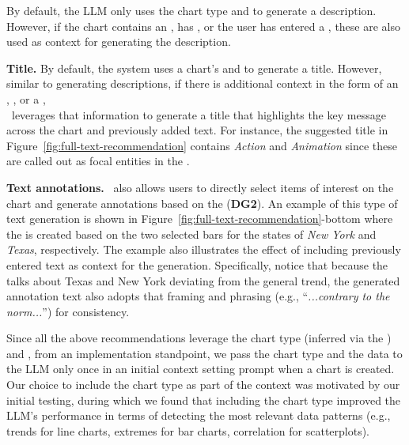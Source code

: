 {By default, the LLM only uses the chart type and  to generate a description.
However, if the chart contains an , has , or the user has entered a , these are also used as context for generating the description.

\textbf{Title.}
By default, the system uses a chart's  and  to generate a title.
However, similar to generating descriptions, if there is additional context in the form of an , , or a ,\\ \pluto~leverages that information to generate a title that highlights the key message across the chart and previously added text.
For instance, the suggested title in Figure~\ref{fig:full-text-recommendation} contains \textit{Action} and \textit{Animation} since these are called out as focal entities in the .

\textbf{Text annotations.}
\pluto~also allows users to directly select items of interest on the chart and generate annotations based on the  (\textbf{DG2}).
An example of this type of text generation is shown in Figure~\ref{fig:full-text-recommendation}-bottom where the  is created based on the two selected bars for the states of \textit{New York} and \textit{Texas}, respectively.
The example also illustrates the effect of including previously entered text as context for the generation.
Specifically, notice that because the  talks about Texas and New York deviating from the general trend, the generated annotation text also adopts that framing and phrasing (e.g., ``\textit{...contrary to the norm...}'') for consistency.
\newline

\noindent{}Since all the above recommendations leverage the chart type (inferred via the ) and , from an implementation standpoint, we pass the chart type and the data to the LLM only once in an initial context setting prompt when a chart is created.
Our choice to include the chart type as part of the context was motivated by our initial testing, during which we found that including the chart type improved the LLM's performance in terms of detecting the most relevant data patterns (e.g., trends for line charts, extremes for bar charts, correlation for scatterplots).

}
